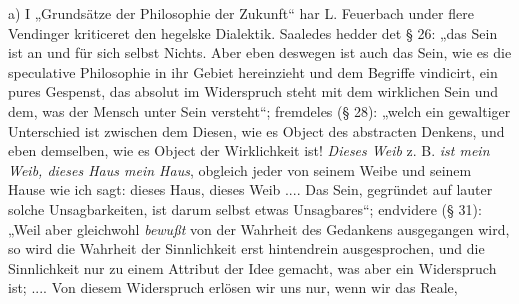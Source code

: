 \documentclass[12pt]{book}
\newcommand{\opage}[1]{\marginnote{\footnotesize\textit{[#1]}}}
\begin{document}
a) I „Grundsätze der Philosophie der Zukunft“ har L. Feuerbach under flere Vendinger
kriticeret den hegelske Dialektik. Saaledes hedder det § 26: „das Sein ist an und für sich
selbst Nichts. Aber eben deswegen ist auch das Sein, wie es die speculative Philosophie in
ihr Gebiet hereinzieht und dem Begriffe vindicirt, ein pures Gespenst, das absolut im
Widerspruch steht mit dem wirklichen Sein und dem, was der Mensch unter Sein versteht“;
fremdeles (§ 28): „welch ein gewaltiger Unterschied ist zwischen dem Diesen, wie es Object
des abstracten Denkens, und eben demselben, wie es Object der Wirklichkeit ist!
\emph{Dieses Weib} z. B. \emph{ist mein Weib, dieses Haus mein Haus}, obgleich jeder von
seinem Weibe und seinem Hause wie ich sagt: dieses Haus, dieses Weib .... Das Sein,
gegründet auf lauter solche Unsagbarkeiten, ist darum selbst etwas Unsagbares“; endvidere
(§ 31): „Weil aber gleichwohl \emph{bewußt} von der Wahrheit des Gedankens ausgegangen
wird, so wird die Wahrheit der Sinnlichkeit erst hintendrein ausgesprochen, und die
Sinnlichkeit nur zu einem Attribut der Idee gemacht, was aber
\opage{194} %
ein Widerspruch ist; .... Von diesem Widerspruch erlösen wir uns nur, wenn wir das Reale,
\end{document}
